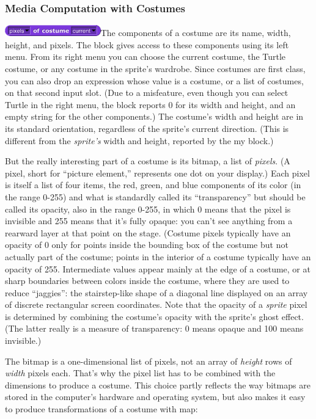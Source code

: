 \subsubsection{Media Computation with
Costumes}\label{media-computation-with-costumes}

\includegraphics[width=1.63194in,height=0.1875in]{media/image783.png}The
components of a costume are its name, width, height, and pixels. The
block gives access to these components using its left menu. From its
right menu you can choose the current costume, the Turtle costume, or
any costume in the sprite's wardrobe. Since costumes are first class,
you can also drop an expression whose value is a costume, or a list of
costumes, on that second input slot. (Due to a misfeature, even though
you can select Turtle in the right menu, the block reports 0 for its
width and height, and an empty string for the other components.) The
costume's width and height are in its standard orientation, regardless
of the sprite's current direction. (This is different from the
\emph{sprite's} width and height, reported by the my block.)

But the really interesting part of a costume is its bitmap, a list of
\emph{pixels}. (A pixel, short for ``picture element,'' represents one
dot on your display.) Each pixel is itself a list of four items, the
red, green, and blue components of its color (in the range 0-255) and
what is standardly called its ``transparency'' but should be called its
opacity, also in the range 0-255, in which 0 means that the pixel is
invisible and 255 means that it's fully opaque: you can't see anything
from a rearward layer at that point on the stage. (Costume pixels
typically have an opacity of 0 only for points inside the bounding box
of the costume but not actually part of the costume; points in the
interior of a costume typically have an opacity of 255. Intermediate
values appear mainly at the edge of a costume, or at sharp boundaries
between colors inside the costume, where they are used to reduce
``jaggies'': the stairstep-like shape of a diagonal line displayed on an
array of discrete rectangular screen coordinates. Note that the opacity
of a \emph{sprite} pixel is determined by combining the costume's
opacity with the sprite's ghost effect. (The latter really is a measure
of transparency: 0 means opaque and 100 means invisible.)

The bitmap is a one-dimensional list of pixels, not an array of
\emph{height} rows of \emph{width} pixels each. That's why the pixel
list has to be combined with the dimensions to produce a costume. This
choice partly reflects the way bitmaps are stored in the computer's
hardware and operating system, but also makes it easy to produce
transformations of a costume with map:

